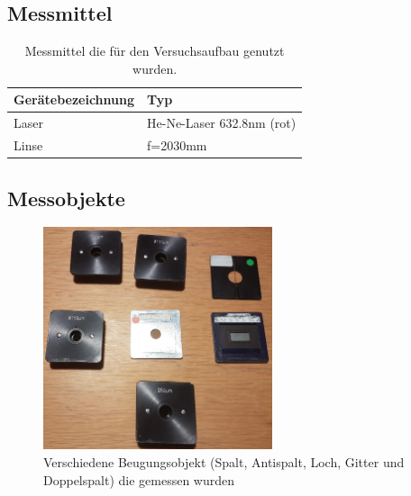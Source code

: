 \subsection{Messmittel}
\begin{table}[h!]
	\centering
	\begin{tabular}{|l|l|}
		\hline
		\rowcolor[rgb]{0.89,0.89,0.89}
		\textbf{Gerätebezeichnung} & \textbf{Typ}   \\ \hline
		Laser                      & He-Ne-Laser 632.8nm (rot)    \\ \hline
		Linse                      & f=2030mm                                     \\ \hline
	\end{tabular}
\caption{Messmittel die für den Versuchsaufbau genutzt wurden.}
\label{Messmittel}
\end{table}

\subsection{Messobjekte}
\begin{figure}[h!]
	\centering
	\includegraphics[width=0.6\textwidth]{data/objekte}
	\caption{Verschiedene Beugungsobjekt (Spalt, Antispalt, Loch, Gitter und Doppelspalt) die gemessen wurden}
	\label{fig:objekte}
\end{figure}

